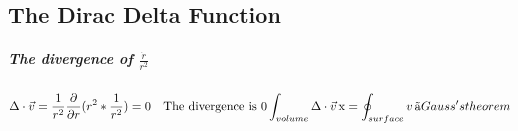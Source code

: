 \documentclass[12pt, letterpaper]{article}
\begin{document}
  \subsection{The Dirac Delta Function}

  \subparagraph{The divergence of $\frac{\dot{r}}{r^2}$}
  \begin{equation}
    \Delta\cdot \vec{v} = \frac{1}{r^2}\frac{\partial}{\partial r}(r^2*\frac{1}{r^2}) = 0 \quad \text{The divergence is 0} \\
    
    \int_{volume}^{}\Delta \cdot \vec{v}  \,\mathrm{x} = \oint_{surface}{}v   \, \mathrm{\vec{a}} \\


    Gauss's theorem
  \end{equation}
\end{document}
